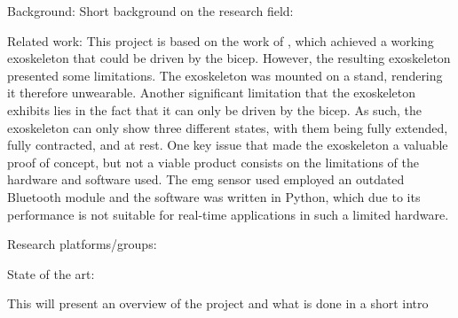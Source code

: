 Background: 
    Short background on the research field:

    Related work: %
        This project is based on the work of \cite{AFES}, which achieved a working exoskeleton that could be driven by the bicep. However, the resulting 
        exoskeleton presented some limitations. The exoskeleton was mounted on a stand, rendering it therefore unwearable. Another significant limitation 
        that the exoskeleton exhibits lies in the fact that it can only be driven by the bicep. As such, the exoskeleton can only show three different states, 
        with them being fully extended, fully contracted, and at rest. One key issue that made the exoskeleton a valuable proof of concept, but not a viable 
        product consists on the limitations of the hardware and software used. The \acs{emg} sensor used employed an outdated Bluetooth module and the software was 
        written in Python, which due to its performance is not suitable for real-time applications in such a limited hardware.

    Research platforms/groups:

    State of the art:


    This will present an overview of the project and what is done in a short intro
